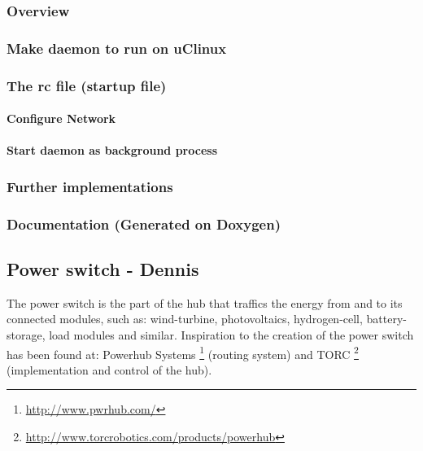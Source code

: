 \subsubsection{Overview}
\subsubsection{Make daemon to run on uClinux}
\subsubsection{The rc file (startup file)}
\paragraph{Configure Network}
\paragraph{Start daemon as background process}
\subsubsection{Further implementations}
\subsubsection{Documentation (Generated on Doxygen)}



\subsection{Power switch - Dennis}
The power switch is the part of the hub that traffics the energy from and to its connected modules, such as: wind-turbine, photovoltaics, hydrogen-cell, battery-storage, load modules and similar. Inspiration to the creation of the power switch has been found at: Powerhub Systems \footnote{\url{http://www.pwrhub.com/}} (routing system) and TORC \footnote{\url{http://www.torcrobotics.com/products/powerhub}} (implementation and control of the hub).
